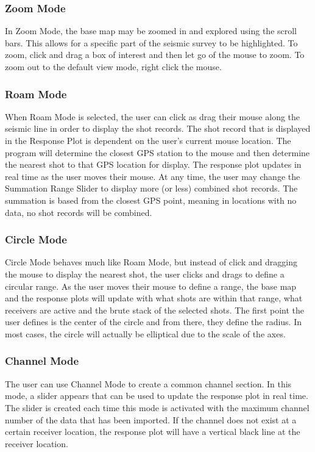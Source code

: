 \documentclass[12pt]{article}
\begin{document}
\subsubsection{Zoom Mode}

In Zoom Mode, the base map may be zoomed in and explored using the scroll bars. This allows for a specific part of the seismic survey to be highlighted. To zoom, click and drag a box of interest and then let go of the mouse to zoom. To zoom out to the default view mode, right click the mouse. 

\subsubsection{Roam Mode}

When Roam Mode is selected, the user can click as drag their mouse along the seismic line in order to display the shot records. The shot record that is displayed in the Response Plot is dependent on the user's current mouse location. The program will determine the closest GPS station to the mouse and then determine the nearest shot to that GPS location for display. The response plot updates in real time as the user moves their mouse. At any time, the user may change the Summation Range Slider to display more (or less) combined shot records. The summation is based from the closest GPS point, meaning in locations with no data, no shot records will be combined.

\subsubsection{Circle Mode}

Circle Mode behaves much like Roam Mode, but instead of click and dragging the mouse to display the nearest shot, the user clicks and drags to define a circular range. As the user moves their mouse to define a range, the base map and the response plots will update with what shots are within that range, what receivers are active and the brute stack of the selected shots. The first point the user defines is the center of the circle and from there, they define the radius. In most cases, the circle will actually be elliptical due to the scale of the axes.

\subsubsection{Channel Mode}

The user can use Channel Mode to create a common channel section. In this mode, a slider appears that can be used to update the response plot in real time. The slider is created each time this mode is activated with the maximum channel number of the data that has been imported. If the channel does not exist at a certain receiver location, the response plot will have a vertical black line at the receiver location.
\end{document}
